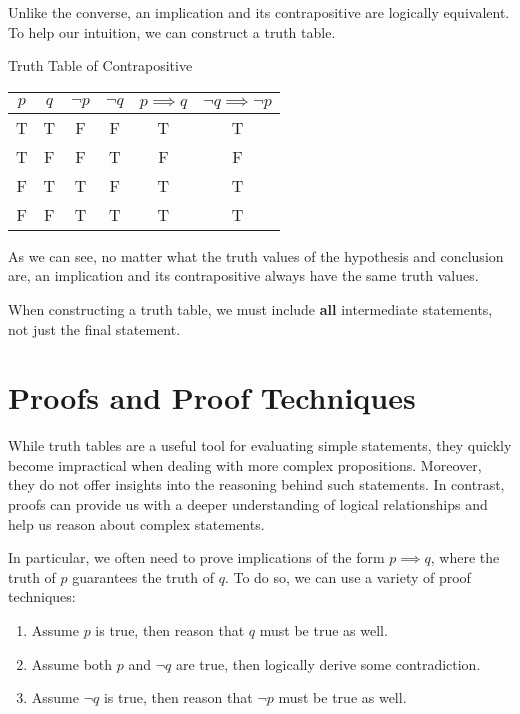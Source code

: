 Unlike the converse, an implication and its contrapositive are logically equivalent. To help our intuition, we can construct a truth table.

\begin{exbox}{Truth Table of Contrapositive}{}
    \begin{center}\begin{tabular}{c | c || c | c | c | c}
        $p$ & $q$ & $\neg p$ & $\neg q$ & $p \implies q$ & $\neg q \implies \neg p$ \\ \hline
        T & T & F & F & T & T \\
        T & F & F & T & F & F \\
        F & T & T & F & T & T \\
        F & F & T & T & T & T
    \end{tabular}\end{center}
\end{exbox}

As we can see, no matter what the truth values of the hypothesis and conclusion are, an implication and its contrapositive always have the same truth values.

\begin{notebox}
    When constructing a truth table, we must include \textbf{all} intermediate statements, not just the final statement.
\end{notebox}



\section{Proofs and Proof Techniques}
While truth tables are a useful tool for evaluating simple statements, they quickly become impractical when dealing with more complex propositions. Moreover, they do not offer insights into the reasoning behind such statements. In contrast, proofs can provide us with a deeper understanding of logical relationships and help us reason about complex statements.

In particular, we often need to prove implications of the form $p \implies q$, where the truth of $p$ guarantees the truth of $q$. To do so, we can use a variety of proof techniques:
\begin{enumerate}
    \item {} Assume $p$ is true, then reason that $q$ must be true as well.
    \item {} Assume both $p$ and $\neg q$ are true, then logically derive some contradiction.
    \item {} Assume $\neg q$ is true, then reason that $\neg p$ must be true as well.
\end{enumerate}


